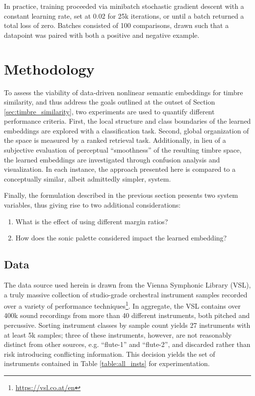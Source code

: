 In practice, training proceeded via minibatch stochastic gradient descent with a constant learning rate, set at 0.02 for 25k iterations, or until a batch returned a total loss of zero.
Batches consisted of 100 comparisons, drawn such that a datapoint was paired with both a positive and negative example.


\section{Methodology}
\label{sec:methodology}


To assess the viability of data-driven nonlinear semantic embeddings for timbre similarity, and thus address the goals outlined at the outset of Section \ref{sec:timbre_similarity}, two experiments are used to quantify different performance criteria.
First, the local structure and class boundaries of the learned embeddings are explored with a classification task.
Second, global organization of the space is measured by a ranked retrieval task.
Additionally, in lieu of a subjective evaluation of perceptual ``smoothness'' of the resulting timbre space, the learned embeddings are investigated through confusion analysis and visualization.
In each instance, the approach presented here is compared to a conceptually similar, albeit admittedly simpler, system.

Finally, the formulation described in the previous section presents two system variables, thus giving rise to two additional considerations:

\begin{enumerate}
\item What is the effect of using different margin ratios?
\item How does the sonic palette considered impact the learned embedding?
\end{enumerate}


\subsection{Data}
The data source used herein is drawn from the Vienna Symphonic Library (VSL), a truly massive collection of studio-grade orchestral instrument samples recorded over a variety of performance techniques\footnote{\url{https://vsl.co.at/en}}.
In aggregate, the VSL contains over 400k sound recordings from more than 40 different instruments, both pitched and percussive.
Sorting instrument classes by sample count yields 27 instruments with at least 5k samples; three of these instruments, however, are not reasonably distinct from other sources, e.g. ``flute-1'' and ``flute-2'', and discarded rather than risk introducing conflicting information.
This decision yields the set of instruments contained in Table \ref{table:all_insts} for experimentation.



